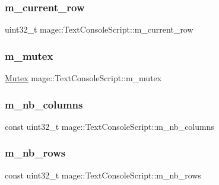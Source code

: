 \subsubsection{\texorpdfstring{m\+\_\+current\+\_\+row}{m\_current\_row}}
{\footnotesize\ttfamily uint32\+\_\+t mage\+::\+Text\+Console\+Script\+::m\+\_\+current\+\_\+row\hspace{0.3cm}{\ttfamily [private]}}

\hypertarget{classmage_1_1_text_console_script_a7212b01c007fc3d2fd11620c570f1c55}{}\label{classmage_1_1_text_console_script_a7212b01c007fc3d2fd11620c570f1c55} 
\subsubsection{\texorpdfstring{m\+\_\+mutex}{m\_mutex}}
{\footnotesize\ttfamily \hyperlink{structmage_1_1_mutex}{Mutex} mage\+::\+Text\+Console\+Script\+::m\+\_\+mutex\hspace{0.3cm}{\ttfamily [private]}}

\hypertarget{classmage_1_1_text_console_script_a6a4f3fdc2fb4be3c01e83363c5d7f631}{}\label{classmage_1_1_text_console_script_a6a4f3fdc2fb4be3c01e83363c5d7f631} 
\subsubsection{\texorpdfstring{m\+\_\+nb\+\_\+columns}{m\_nb\_columns}}
{\footnotesize\ttfamily const uint32\+\_\+t mage\+::\+Text\+Console\+Script\+::m\+\_\+nb\+\_\+columns\hspace{0.3cm}{\ttfamily [private]}}

\hypertarget{classmage_1_1_text_console_script_ac2e2d9630355f22945259d5a0af135ef}{}\label{classmage_1_1_text_console_script_ac2e2d9630355f22945259d5a0af135ef} 
\subsubsection{\texorpdfstring{m\+\_\+nb\+\_\+rows}{m\_nb\_rows}}
{\footnotesize\ttfamily const uint32\+\_\+t mage\+::\+Text\+Console\+Script\+::m\+\_\+nb\+\_\+rows\hspace{0.3cm}{\ttfamily [private]}}


